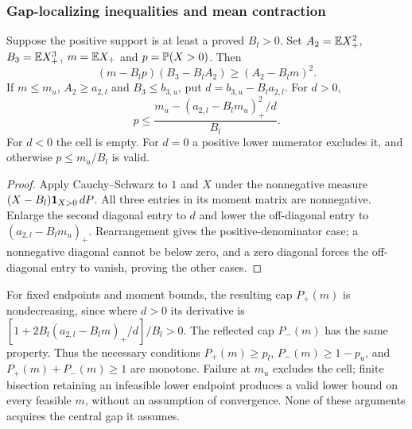 \subsubsection{Gap-localizing inequalities and mean contraction}
\begin{lemma}\label{ms:finite:gap-localizing}
Suppose the positive support is at least a proved $B_l>0$. Set
$A_2=\mathbb E X_+^2$, $B_3=\mathbb E X_+^3$, $m=\mathbb E X_+$ and $p=\mathbb P(X>0)$.
Then
\[
 (m-B_lp)(B_3-B_lA_2)\ge(A_2-B_lm)^2.
\]
If $m\le m_u$, $A_2\ge a_{2,l}$ and $B_3\le b_{3,u}$, put
$d=b_{3,u}-B_la_{2,l}$. For $d>0$,
\[
 p\le\frac{m_u-(a_{2,l}-B_lm_u)_+^2/d}{B_l}.
\]
For $d<0$ the cell is empty. For $d=0$ a positive lower numerator
excludes it, and otherwise $p\le m_u/B_l$ is valid.
\end{lemma}
\begin{proof}
Apply Cauchy--Schwarz to $1$ and $X$ under the nonnegative measure
$(X-B_l)\mathbf 1_{X>0}\,dP$. All three entries in its moment matrix are
nonnegative. Enlarge the second diagonal entry to $d$ and lower the
off-diagonal entry to $(a_{2,l}-B_lm_u)_+$. Rearrangement gives the
positive-denominator case; a nonnegative diagonal cannot be below zero,
and a zero diagonal forces the off-diagonal entry to vanish, proving the
other cases.
\end{proof}
For fixed endpoints and moment bounds, the resulting cap $P_+(m)$ is
nondecreasing, since where $d>0$ its derivative is
$[1+2B_l(a_{2,l}-B_lm)_+/d]/B_l>0$. The reflected cap $P_-(m)$
has the same property. Thus the necessary conditions
$P_+(m)\ge p_l$, $P_-(m)\ge1-p_u$, and $P_+(m)+P_-(m)\ge1$
are monotone. Failure at $m_u$ excludes the cell; finite bisection
retaining an infeasible lower endpoint produces a valid lower bound on
every feasible $m$, without an assumption of convergence. None of these
arguments acquires the central gap it assumes.

